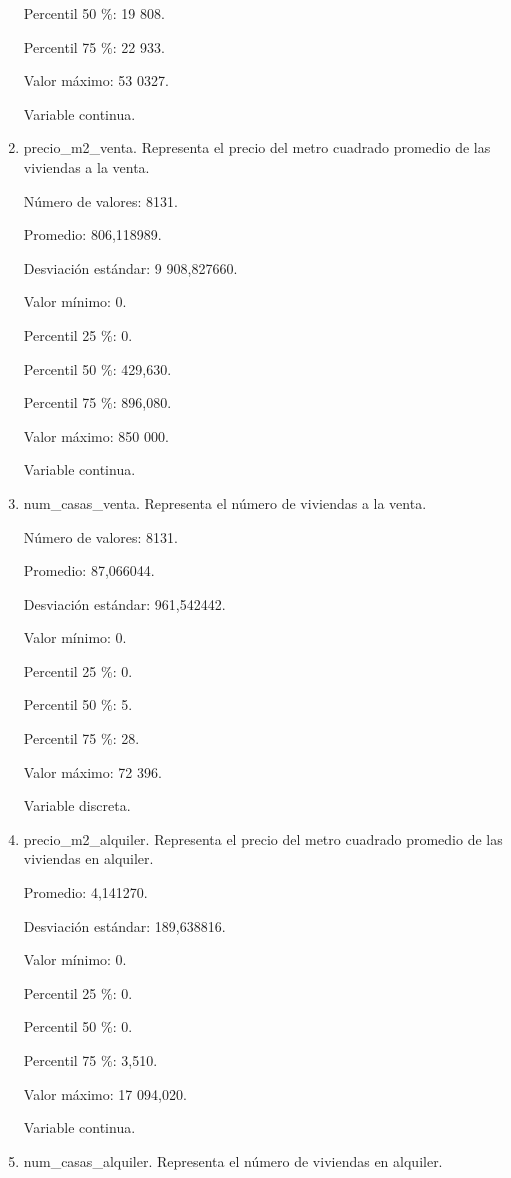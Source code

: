 \begin{enumerate}
	Percentil 50 \%: 19 808.
	
	Percentil 75 \%: 22 933.
	
	Valor máximo: 53 0327.
	
	Variable continua.

	\item precio\_m2\_venta. Representa el precio del metro cuadrado promedio de las viviendas a la venta.
	
	Número de valores: 8131.
	
	Promedio: 806,118989.
	
	Desviación estándar: 9 908,827660.
	
	Valor mínimo: 0.
	
	Percentil 25 \%: 0.
	
	Percentil 50 \%: 429,630.
	
	Percentil 75 \%: 896,080.
	
	Valor máximo: 850 000.
	
	Variable continua.

	\item num\_casas\_venta. Representa el número de viviendas a la venta.
	
	Número de valores: 8131.
	
	Promedio: 87,066044.
	
	Desviación estándar: 961,542442.
	
	Valor mínimo: 0.
	
	Percentil 25 \%: 0.
	
	Percentil 50 \%: 5.
	
	Percentil 75 \%: 28.
	
	Valor máximo: 72 396.
	
	Variable discreta.

	\item precio\_m2\_alquiler. Representa el precio del metro cuadrado promedio de las viviendas en alquiler.
	
	Promedio: 4,141270.
	
	Desviación estándar: 189,638816.
	
	Valor mínimo: 0.
	
	Percentil 25 \%: 0.
	
	Percentil 50 \%: 0.
	
	Percentil 75 \%: 3,510.
	
	Valor máximo: 17 094,020.
	
	Variable continua.

	\item num\_casas\_alquiler. Representa el número de viviendas en alquiler.
	

\end{enumerate}
